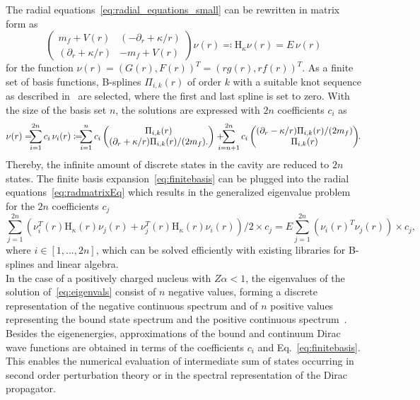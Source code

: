 The radial equations~\eqref{eq:radial_equations_small} can be rewritten in matrix form as
\begin{equation}
\begin{pmatrix}
m_f+V(r)&(-\partial_r + \kappa/r)\\
(\partial_r + \kappa/r)&-m_f+V(r)
\end{pmatrix}
\nu(r)\eqqcolon\mathrm{H}_\kappa \nu(r)
= E\,\nu(r)
\label{eq:radmatrixEq}
\end{equation}
for the function $\nu(r)=(G(r),F(r))^T=(r g(r),r f(r))^T$. As a finite set of basis functions, B-splines $\Pi_{i,k}(r)$ of order $k$  with a suitable knot sequence as described in~\cite{johnson1988} are selected, where the first and last spline is set to zero. With the size of the basis set $n$, the solutions are expressed with $2n$ coefficients $c_i$ as
\begin{equation}
\nu(r)=\hspace{-0.2cm}\sum_{i=1}^{2n}c_i\,\nu_i(r)\coloneqq \hspace{-0.2cm}\sum_{i=1}^n
c_i\begin{pmatrix}
\Pi_{i,k}(r)\\
(\partial_r +\kappa/r)\Pi_{i,k}(r)/(2m_f).
\end{pmatrix}
+\hspace{-0.3cm}
\sum_{i=n+1}^{2n}c_i
\begin{pmatrix}
(\partial_r -\kappa/r)\Pi_{i,k}(r)/(2m_f)\\
\Pi_{i,k}(r)
\end{pmatrix}\hspace{-0.1cm}.
\label{eq:finitebasis}
\end{equation}
Thereby, the infinite amount of discrete states in the cavity are reduced to $2n$ states. The finite basis expansion~\eqref{eq:finitebasis} can be plugged into the radial equations~\eqref{eq:radmatrixEq} which results in the generalized eigenvalue problem~\cite{Shabaev2004} for the $2n$ coefficients $c_j$
\begin{equation}
\sum_{j=1}^{2n} \left(\nu_i^T(r)\mathrm{H}_\kappa(r)\nu_j(r)+\nu_j^T(r)\mathrm{H}_\kappa(r)\nu_i(r)\right)/2 \times c_j = E \sum_{j=1}^{2n}(\nu_i(r)^T\nu_j(r))\times c_j,
\label{eq:eigenvals}
\end{equation}
where $i\in [1,...,2n]$, 
which can be solved efficiently with existing libraries for B-splines and linear algebra. \\
In the case of a positively charged nucleus with $Z\alpha<1$, the eigenvalues of the solution of~\eqref{eq:eigenvals} consist of $n$ negative values, forming a discrete representation of the negative continuous spectrum and of $n$ positive values representing the bound state spectrum and the positive continuous spectrum~\cite{drake1981}. Besides the eigenenergies, approximations of the bound and continuum Dirac wave functions are obtained in terms of the coefficients $c_i$ and Eq.~\eqref{eq:finitebasis}. This enables the numerical evaluation of intermediate sum of states occurring in second order perturbation theory or in the spectral representation of the Dirac propagator.





